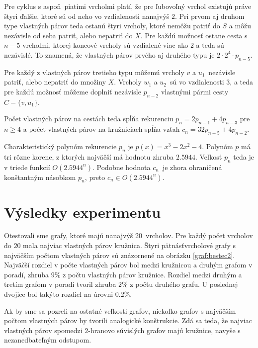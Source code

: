 Pre cyklus s aspoň piatimi vrcholmi platí, že pre ľubovoľný vrchol existujú práve štyri ďalšie, ktoré
sú od neho vo vzdialenosti nanajvýš $2$. Pri prvom aj druhom type vlastných párov teda ostanú
štyri vrcholy, ktoré nemôžu patriť do $S$ a môžu nezávisle od seba patriť, alebo nepatriť do $X$.
Pre každú možnosť ostane cesta s $n - 5$ vrcholmi, ktorej koncové vrcholy sú vzdialené viac ako $2$
a teda sú nezávislé. To znamená, že vlastných párov prvého aj druhého typu je $2 \cdot 2^4 \cdot p_{n-5}$.

Pre každý z vlastných párov tretieho typu môžemú vrcholy $v$ a $u_1$ nezávisle patriť, alebo nepatriť
do množiny $X$. Vrcholy $w_1$ a $u_2$ sú vo vzdialenosti $3$, a teda pre každú možnosť môžeme
doplniť nezávisle $p_{n-2}$ vlastnými pármi cesty $C - \{v, u_1\}$.

Počet vlastných párov na cestách teda spĺňa rekurenciu $p_n = 2p_{n-1} + 4p_{n-3}$ pre $n \ge 4$
a počet vlastných párov na kružniciach spĺňa vzťah $c_n = 32 p_{n-5} + 4p_{n-2}$.

Charakteristický polynóm rekurencie $p_n$ je $p(x) = x^3 - 2x^2 - 4$. Polynóm $p$ má tri rôzne
korene, z ktorých najväčší má hodnotu zhruba $2.5944$. Veľkosť $p_n$ teda je v triede funkcií
$O(2.5944^n)$. Podobne hodnota $c_n$ je zhora ohraničená konštantným násobkom $p_n$, preto
$c_n \in O(2.5944^n)$.

\section{Výsledky experimentu}

Otestovali sme grafy, ktoré majú nanajvýš $20$ vrcholov. Pre každý počet vrcholov do $20$ mala
najviac vlastných párov kružnica. Štyri pätnásťvrcholové grafy s najväčším počtom vlastných
párov sú znázornené na obrázku \ref{graf:bestec2}. Najväčší rozdiel v počte vlastných párov
bol medzi kružnicou a druhým grafom v poradí, zhruba $9\%$ z počtu vlastných párov kružnice.
Rozdiel medzi druhým a tretím grafom v poradí tvoril zhruba $2\%$ z počtu druhého grafu. U poslednej
dvojice bol takýto rozdiel na úrovni $0.2\%$.

Ak by sme sa pozreli na ostatné veľkosti grafov, niekoľko grafov s najväčším počtom vlastných párov
by tvorili analogické konštrukcie. Zdá sa teda, že najviac vlastných párov spomedzi $2$-hranovo súvislých
grafov majú kružnice, navyše s nezanedbateľným odstupom.

